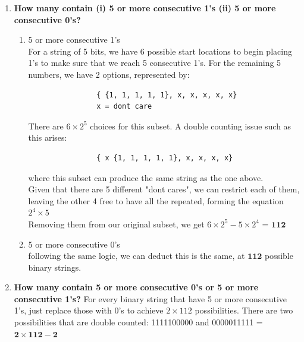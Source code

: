 \documentclass{article}
\begin{document}
    \begin{enumerate}[label=(\alph*)]
        \item \textbf{How many contain (i) 5 or more consecutive 1’s (ii) 5 or more consecutive 0’s?}
        \begin{enumerate}[label=(\roman*)]
            \item 5 or more consecutive 1's
            \\ For a string of 5 bits, we have 6 possible start locations to begin placing 1's to make 
            sure that we reach 5 consecutive 1's. For the remaining 5 numbers, we have 2 options, represented
            by:
            \begin{verbatim}
                { {1, 1, 1, 1, 1}, x, x, x, x, x}
                x = dont care
            \end{verbatim}
            There are $6 \times 2^5$ choices for this subset. A double counting issue such as this arises:
            \begin{verbatim}
                { x {1, 1, 1, 1, 1}, x, x, x, x}
            \end{verbatim}
            where this subset can produce the same string as the one above.\\
            Given that there are 5 different "dont cares", we can restrict each of them, leaving the other 4 free to have all the repeated, forming the equation $2^4 \times 5$\\
            Removing them from our original subset, we get $6 \times 2^5 - 5 \times 2^4$ = {\LARGE $\boxed{\mathbf{112}}$}
            \item 5 or more consecutive 0's
            \\ following the same logic, we can deduct this is the same, at {\LARGE $\boxed{\mathbf{112}}$}
            possible binary strings.
        \end{enumerate}
        \item \textbf{How many contain 5 or more consecutive 0’s or 5 or more consecutive 1’s?}
        For every binary string that have 5 or more consecutive 1's, just replace those with 0's
        to achieve $2 \times 112$ possibilities. There are two possibilities that are double
        counted: 1111100000 and 0000011111 = {\LARGE $\boxed{\mathbf{2 \times 112 - 2}}$}
    \end{enumerate}
\end{document}
